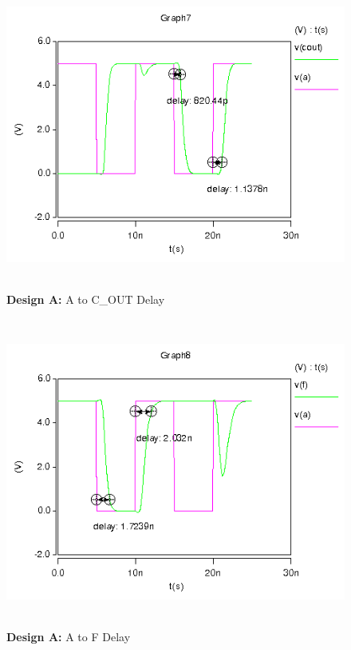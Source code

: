 \documentclass{article}
\begin{document}


\begin{figure}[H]
    \centering
    \includegraphics[height=4in]{../part_3/xiaohui/va_cout_delay_inv.png}
    \caption{\textbf{Design A:} A to C\_OUT Delay}
\end{figure}

\begin{figure}[H]
    \centering
    \includegraphics[height=4in]{../part_3/xiaohui/va_vf_delay_inv.png}
    \caption{\textbf{Design A:} A to F Delay}
\end{figure}
\end{document}
